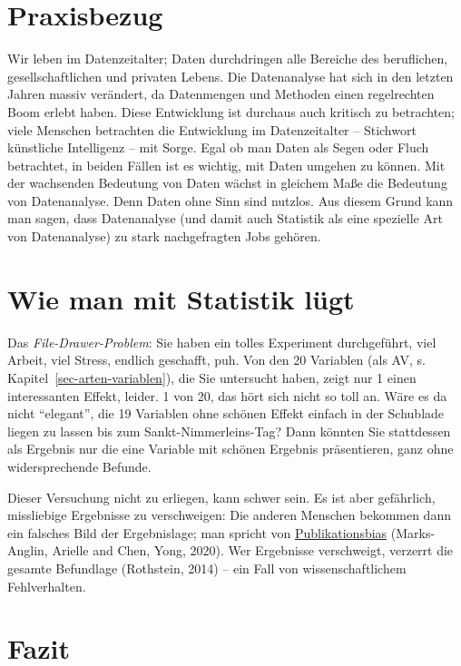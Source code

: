 \documentclass[
  letterpaper,
  twoside,
  open=any]{scrbook}
\theoremstyle{definition}
\theoremstyle{definition}
\theoremstyle{definition}
\theoremstyle{remark}
\begin{document}
\section{Praxisbezug}\label{praxisbezug}

Wir leben im Datenzeitalter; Daten durchdringen alle Bereiche des
beruflichen, gesellschaftlichen und privaten Lebens. Die Datenanalyse
hat sich in den letzten Jahren massiv verändert, da Datenmengen und
Methoden einen regelrechten Boom erlebt haben. Diese Entwicklung ist
durchaus auch kritisch zu betrachten; viele Menschen betrachten die
Entwicklung im Datenzeitalter -- Stichwort künstliche Intelligenz -- mit
Sorge. Egal ob man Daten als Segen oder Fluch betrachtet, in beiden
Fällen ist es wichtig, mit Daten umgehen zu können. Mit der wachsenden
Bedeutung von Daten wächst in gleichem Maße die Bedeutung von
Datenanalyse. Denn Daten ohne Sinn sind nutzlos. Aus diesem Grund kann
man sagen, dass Datenanalyse (und damit auch Statistik als eine
spezielle Art von Datenanalyse) zu stark nachgefragten Jobs gehören.

\section{Wie man mit Statistik
lügt}\label{wie-man-mit-statistik-luxfcgt}

Das \emph{File-Drawer-Problem}: Sie haben ein tolles Experiment
durchgeführt, viel Arbeit, viel Stress, endlich geschafft, puh. Von den
20 Variablen (als AV, s. Kapitel~\ref{sec-arten-variablen}), die Sie
untersucht haben, zeigt nur 1 einen interessanten Effekt, leider. 1 von
20, das hört sich nicht so toll an. Wäre es da nicht \enquote{elegant},
die 19 Variablen ohne schönen Effekt einfach in der Schublade liegen zu
lassen bis zum Sankt-Nimmerleins-Tag? Dann könnten Sie stattdessen als
Ergebnis nur die eine Variable mit schönen Ergebnis präsentieren, ganz
ohne widersprechende Befunde.

Dieser Versuchung nicht zu erliegen, kann schwer sein. Es ist aber
gefährlich, missliebige Ergebnisse zu verschweigen: Die anderen Menschen
bekommen dann ein falsches Bild der Ergebnislage; man spricht von
\href{https://de.wikipedia.org/wiki/Publikationsbias}{Publikationsbias}
(Marks-Anglin, Arielle and Chen, Yong, 2020). Wer Ergebnisse
verschweigt, verzerrt die gesamte Befundlage (Rothstein, 2014) -- ein
Fall von wissenschaftlichem Fehlverhalten.

\section{Fazit}\label{fazit-1}
\end{document}
